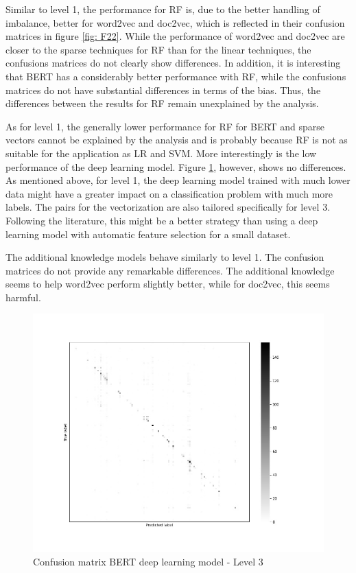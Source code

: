 \documentclass[12pt, a4paper, titlepage]{article}
\begin{document}
Similar to level 1, the performance for \ac{RF} is, due to the better handling of imbalance, better for word2vec and doc2vec, which is reflected in their confusion matrices in figure \ref{fig: F22}. While the performance of word2vec and doc2vec are closer to the sparse techniques for \ac{RF} than for the linear techniques, the confusions matrices do not clearly show differences. In addition, it is interesting that \ac{BERT} has a considerably better performance with \ac{RF}, while the confusions matrices do not have substantial differences in terms of the bias. Thus, the differences between the results for \ac{RF} remain unexplained by the analysis.

As for level 1, the generally lower performance for \ac{RF} for \ac{BERT} and sparse vectors cannot be explained by the analysis and is probably because \ac{RF} is not as suitable for the application as \ac{LR} and \ac{SVM}. More interestingly is the low performance of the deep learning model. Figure \ref{fig: F26}, however, shows no differences. As mentioned above, for level 1, the deep learning model trained with much lower data might have a greater impact on a classification problem with much more labels. The pairs for the vectorization are also tailored specifically for level 3. Following the literature, this might be a better strategy than using a deep learning model with automatic feature selection for a small dataset. 

The additional knowledge models behave similarly to level 1. The confusion matrices do not provide any remarkable differences. The additional knowledge seems to help word2vec perform slightly better, while for doc2vec, this seems harmful. 

\begin{figure}[hb!]
  \center
  \includegraphics[scale=0.5]{cm_bert_clf_3.jpg}
  \caption{\label{fig: F26} Confusion matrix \ac{BERT} deep learning model - Level 3}
\end{figure}
\end{document}
